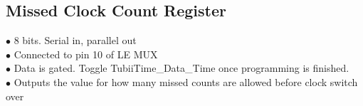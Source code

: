 \documentclass[11pt,a4paper]{article}
\begin{document}
\subsection{Missed Clock Count Register}
$\bullet$ 8 bits. Serial in, parallel out \\
$\bullet$ Connected to pin 10 of LE MUX \\
$\bullet$ Data is gated. Toggle TubiiTime\_Data\_Time once programming is finished.\\
$\bullet$ Outputs the value for how many missed counts are allowed before clock switch over \\
\end{document}
